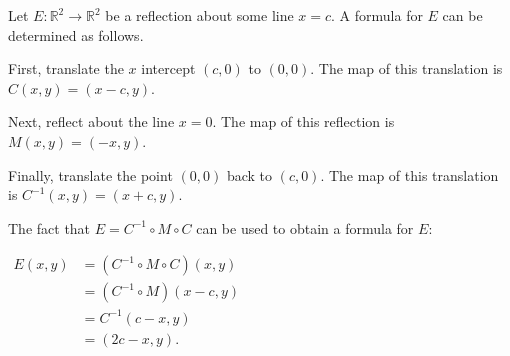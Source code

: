 \documentclass[12pt]{article}
\begin{document}
Let $E \colon \mathbb{R}^2 \to \mathbb{R}^2$ be a reflection about some line $x=c$.  A formula for $E$ can be determined as follows.

First, translate the $x$ intercept $(c,0)$ to $(0,0)$.  The map of this translation is $C(x,y)=(x-c,y)$.

Next, reflect about the line $x=0$.  The map of this reflection is $M(x,y)=(-x,y)$.

Finally, translate the point $(0,0)$ back to $(c,0)$.  The map of this translation is $C^{-1}(x,y)=(x+c,y)$.

The fact that $E=C^{-1} \circ M \circ C$ can be used to obtain a formula for $E$:

\begin{center}
$\begin{array}{rl}
E(x,y) & =(C^{-1} \circ M \circ C)(x,y) \\
& =(C^{-1} \circ M)(x-c,y) \\
& =C^{-1}(c-x,y) \\
& =(2c-x,y). \end{array}$
\end{center}
\end{document}
